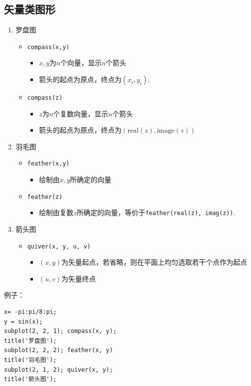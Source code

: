 \subsection{矢量类图形}
\label{矢量类}
\begin{enumerate}
	\item 罗盘图
	\begin{itemize}
		\item \lstinline|compass(x,y)|
		\begin{itemize}
			\item $x,y$为$n$个向量，显示$n$个箭头
			\item 箭头的起点为原点，终点为$(x_i,y_i)$.
		\end{itemize}
		\item \lstinline|compass(z)|
		\begin{itemize}
			\item $z$为$n$个复数向量，显示$n$个箭头
			\item 箭头的起点为原点，终点为$(\text{real}(z),\text{image}(z))$
		\end{itemize}
	\end{itemize}
	\item 羽毛图
	\begin{itemize}
		\item \lstinline|feather(x,y)|
		\begin{itemize}
			\item 绘制由$x,y$所确定的向量
		\end{itemize}
		\item \lstinline|feather(z)|
		\begin{itemize}
			\item 绘制由复数$z$所确定的向量，等价于\lstinline|feather(real(z), imag(z))|.
		\end{itemize}
	\end{itemize}
	\item 箭头图
	\begin{itemize}
		\item \lstinline|quiver(x, y, u, v)|
		\begin{itemize}
			\item $(x,y)$为矢量起点，若省略，则在平面上均匀选取若干个点作为起点
			\item $(u,v)$为矢量终点
		\end{itemize}
	\end{itemize}
\end{enumerate}
例子：
\begin{lstlisting}
x= -pi:pi/8:pi;
y = sin(x);
subplot(2, 2, 1); compass(x, y);
title('罗盘图');
subplot(2, 2, 2); feather(x, y)
title('羽毛图');
subplot(2, 1, 2); quiver(x, y);
title('箭头图');
\end{lstlisting}
